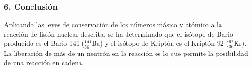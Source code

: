 \subsubsection*{6. Conclusión}
\begin{cajaconclusion}
Aplicando las leyes de conservación de los números másico y atómico a la reacción de fisión nuclear descrita, se ha determinado que el isótopo de Bario producido es el Bario-141 (${}_{56}^{141}\text{Ba}$) y el isótopo de Kriptón es el Kriptón-92 (${}_{36}^{92}\text{Kr}$). La liberación de más de un neutrón en la reacción es lo que permite la posibilidad de una reacción en cadena.
\end{cajaconclusion}

\newpage
